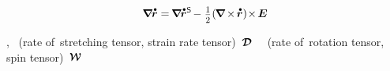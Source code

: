 \nopagebreak\vspace{-0.1em}\begin{equation*}
\boldnabla \hspace{-0.16ex} \mathdotabove{\currentlocationvector}
= \hspace{-0.2ex} \boldnabla \hspace{-0.16ex} \mathdotabove{\currentlocationvector}^{\mathsf{S}} \hspace{-0.25ex}
- \hspace{.1ex} \smalldisplaystyleonehalf \hspace{-0.33ex} \left( \hspace{-0.2ex} \boldnabla \hspace{-0.15ex}\times\hspace{-0.25ex} \mathdotabove{\currentlocationvector} \right) \hspace{-0.4ex} \times \hspace{-0.2ex} \UnitDyad
\end{equation*}

\vspace{-0.1em}\noindent
{},  ~(rate of~stretching tensor, strain rate tensor)~${\bm{\mathcal{D}}}$ ~~(rate of~rotation tensor, spin tensor)~${\vorticitytensor}$


